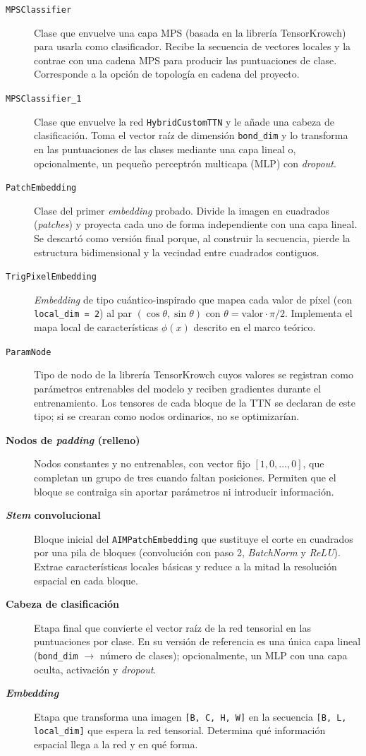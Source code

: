 \begin{description}
  \item[\texttt{MPSClassifier}] Clase que envuelve una capa MPS (basada en la librería TensorKrowch) para usarla como clasificador. Recibe la secuencia de vectores locales y la contrae con una cadena MPS para producir las puntuaciones de clase. Corresponde a la opción de topología en cadena del proyecto.
  \item[\texttt{MPSClassifier\_1}] Clase que envuelve la red \texttt{HybridCustomTTN} y le añade una cabeza de clasificación. Toma el vector raíz de dimensión \texttt{bond\_dim} y lo transforma en las puntuaciones de las clases mediante una capa lineal o, opcionalmente, un pequeño perceptrón multicapa (MLP) con \textit{dropout}.
  \item[\texttt{PatchEmbedding}] Clase del primer \textit{embedding} probado. Divide la imagen en cuadrados (\textit{patches}) y proyecta cada uno de forma independiente con una capa lineal. Se descartó como versión final porque, al construir la secuencia, pierde la estructura bidimensional y la vecindad entre cuadrados contiguos.
  \item[\texttt{TrigPixelEmbedding}] \textit{Embedding} de tipo cuántico-inspirado que mapea cada valor de píxel (con \texttt{local\_dim = 2}) al par $(\cos\theta, \sin\theta)$ con $\theta = \text{valor}\cdot\pi/2$. Implementa el mapa local de características $\phi(x)$ descrito en el marco teórico.
  \item[\texttt{ParamNode}] Tipo de nodo de la librería TensorKrowch cuyos valores se registran como parámetros entrenables del modelo y reciben gradientes durante el entrenamiento. Los tensores de cada bloque de la TTN se declaran de este tipo; si se crearan como nodos ordinarios, no se optimizarían.
  \item[\textbf{Nodos de \textit{padding} (relleno)}] Nodos constantes y no entrenables, con vector fijo $[1, 0, \dots, 0]$, que completan un grupo de tres cuando faltan posiciones. Permiten que el bloque se contraiga sin aportar parámetros ni introducir información.
  \item[\textbf{\textit{Stem} convolucional}] Bloque inicial del \texttt{AIMPatchEmbedding} que sustituye el corte en cuadrados por una pila de bloques (convolución con paso 2, \textit{BatchNorm} y \textit{ReLU}). Extrae características locales básicas y reduce a la mitad la resolución espacial en cada bloque.
  \item[\textbf{Cabeza de clasificación}] Etapa final que convierte el vector raíz de la red tensorial en las puntuaciones por clase. En su versión de referencia es una única capa lineal (\texttt{bond\_dim} $\to$ número de clases); opcionalmente, un MLP con una capa oculta, activación y \textit{dropout}.
  \item[\textbf{\textit{Embedding}}] Etapa que transforma una imagen \texttt{[B, C, H, W]} en la secuencia \texttt{[B, L, local\_dim]} que espera la red tensorial. Determina qué información espacial llega a la red y en qué forma.
\end{description}

